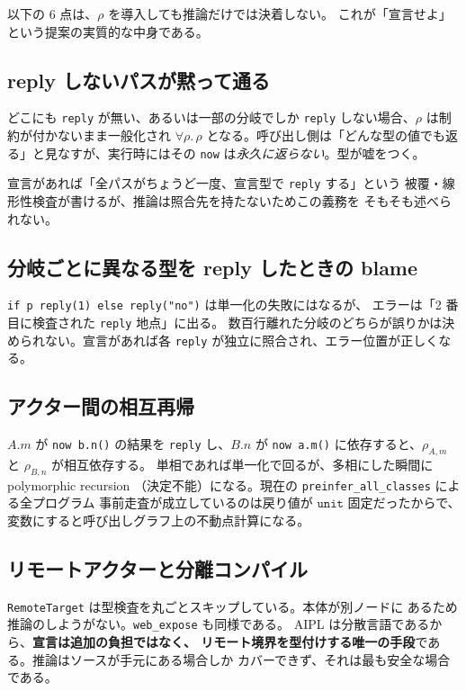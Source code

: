 \documentclass[11pt,a4paper]{ltjsarticle}
\theoremstyle{definition}
\theoremstyle{remark}
\newcommand{\ty}[1]{\ensuremath{\mathtt{#1}}}
\begin{document}
以下の 6 点は、$\rho$ を導入しても推論だけでは決着しない。
これが「宣言せよ」という提案の実質的な中身である。

\subsection{reply しないパスが黙って通る}

どこにも \texttt{reply} が無い、あるいは一部の分岐でしか \texttt{reply}
しない場合、$\rho$ は制約が付かないまま一般化され $\forall\rho.\,\rho$
となる。呼び出し側は「どんな型の値でも返る」と見なすが、実行時にはその
\texttt{now} は\emph{永久に返らない}。型が嘘をつく。

宣言があれば「全パスがちょうど一度、宣言型で \texttt{reply} する」という
被覆・線形性検査が書けるが、推論は照合先を持たないためこの義務を
そもそも述べられない。

\subsection{分岐ごとに異なる型を reply したときの blame}

\texttt{if p reply(1) else reply("no")} は単一化の失敗にはなるが、
エラーは「2 番目に検査された \texttt{reply} 地点」に出る。
数百行離れた分岐のどちらが誤りかは決められない。宣言があれば各
\texttt{reply} が独立に照合され、エラー位置が正しくなる。

\subsection{アクター間の相互再帰}

$A.m$ が \texttt{now b.n()} の結果を \texttt{reply} し、$B.n$ が
\texttt{now a.m()} に依存すると、$\rho_{A,m}$ と $\rho_{B,n}$ が相互依存する。
単相であれば単一化で回るが、多相にした瞬間に polymorphic recursion
（決定不能）になる。現在の \texttt{preinfer\_all\_classes} による全プログラム
事前走査が成立しているのは戻り値が \ty{unit} 固定だったからで、
変数にすると呼び出しグラフ上の不動点計算になる。

\subsection{リモートアクターと分離コンパイル}

\texttt{RemoteTarget} は型検査を丸ごとスキップしている。本体が別ノードに
あるため推論のしようがない。\texttt{web\_expose} も同様である。
AIPL は分散言語であるから、\textbf{宣言は追加の負担ではなく、
リモート境界を型付けする唯一の手段}である。推論はソースが手元にある場合しか
カバーできず、それは最も安全な場合である。
\end{document}
